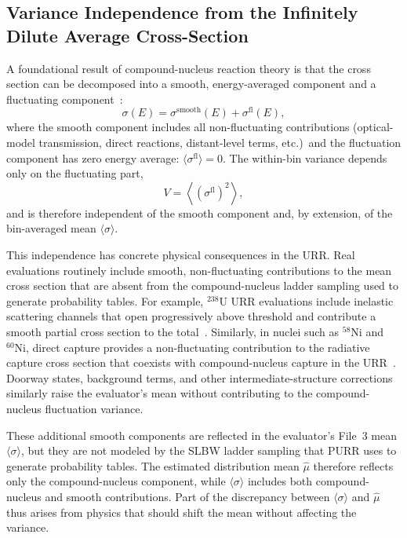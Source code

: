 \documentclass{style/nseJournal}
\newcommand{\isotope}[2]{\ensuremath{^{#1}\mathrm{#2}}}
\newcommand{\sbin}{\langle \sigma \rangle}
\begin{document}
\subsection{Variance Independence from the Infinitely Dilute Average Cross-Section}
\label{ssec:variance-independence}

A foundational result of compound-nucleus reaction theory is that the cross section can be decomposed into a smooth, energy-averaged component and a fluctuating component~\cite{Kawai1973,Carlson_2014}:
\begin{equation}
\sigma(E) = \sigma^{\text{smooth}}(E) + \sigma^{\text{fl}}(E),
\label{eq:sigma-decomp}
\end{equation}
where the smooth component includes all non-fluctuating contributions (optical-model transmission, direct reactions, distant-level terms, etc.)\ and the fluctuation component has zero energy average: $\langle\sigma^{\text{fl}}\rangle = 0$. The within-bin variance depends only on the fluctuating part,
\begin{equation}
V = \left\langle\left(\sigma^{\text{fl}}\right)^2\right\rangle,
\label{eq:V-from-fluct}
\end{equation}
and is therefore independent of the smooth component and, by extension, of the bin-averaged mean $\langle\sigma\rangle$.

This independence has concrete physical consequences in the URR. Real evaluations routinely include smooth, non-fluctuating contributions to the mean cross section that are absent from the compound-nucleus ladder sampling used to generate probability tables. For example, \isotope{238}{U} URR evaluations include inelastic scattering channels that open progressively above threshold and contribute a smooth partial cross section to the total~\cite{10_1016_s0306_4549_02_00005_1}. Similarly, in nuclei such as \isotope{58}{Ni} and \isotope{60}{Ni}, direct capture provides a non-fluctuating contribution to the radiative capture cross section that coexists with compound-nucleus capture in the URR~\cite{10_1103_physrevc_82_057601}. Doorway states, background terms, and other intermediate-structure corrections similarly raise the evaluator's mean without contributing to the compound-nucleus fluctuation variance.

These additional smooth components are reflected in the evaluator's File~3 mean $\sbin$, but they are not modeled by the SLBW ladder sampling that PURR uses to generate probability tables. The estimated distribution mean $\hat{\mu}$ therefore reflects only the compound-nucleus component, while $\sbin$ includes both compound-nucleus and smooth contributions. Part of the discrepancy between $\sbin$ and $\hat{\mu}$ thus arises from physics that should shift the mean without affecting the variance.
\end{document}
